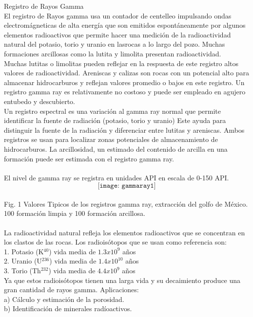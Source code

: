 \documentclass[10pt,a4paper]{report}
\begin{document}
\newpage
Registro de Rayos Gamma
\\ El registro de Rayos gamma usa un contador de centelleo impulsando ondas electromágneticas de alta energía que son emitidos espontáneamente por algunos elementos radioactivos que permite hacer una medición de la radioactividad natural del potasio, torio y uranio en lasrocas a lo largo del pozo. Muchas formaciones arcillosas como la lutita y limolita presentan radioactividad.
\\ Muchas lutitas o limolitas pueden reflejar en la respuesta de este registro altos valores de radioactividad. Areniscas y calizas son rocas con un potencial alto para almacenar hidrocarburos y reflejan valores promedio o bajos en este registro. Un registro gamma ray es relativamente no costoso y puede ser empleado en agujero entubedo y descubierto. 
\\ Un registro espectral es una variación al gamma ray normal que permite identificar la fuente de radiación (potasio, torio y uranio) Este ayuda para distinguir la fuente de la radiación y diferenciar entre lutitas y areniscas. Ambos registros se usan para localizar zonas potenciales de almacenamiento de hidrocarburos. La arcillosidad, un estimado del contenido de arcilla en una formación puede ser estimada con el registro gamma ray.
\\\\El nivel de gamma ray se registra en unidades API en escala de 0-150 API.
\\  $$\texttt{[image: gammaray1]}$$ 
\\ Fig. 1 Valores Tipicos de los registros gamma ray, extracción del golfo de México. 100 formación limpia y 100 formación arcillosa. 
\\\\ La radioactividad natural refleja los elementos radioactivos que se concentran en los clastos de las rocas. Los radioisótopos que se usan como referencia son:
\\ 1. Potasio (K$^40$) vida media de $1.3x10^9$ años
\\ 2. Uranio (U$^236$) vida media de $1.4x10^10$ años
\\ 3. Torio (Th$^232$) vida media de $4.4x10^9$ años
\\ Ya que estos radioisótopos tienen una larga vida y su decaimiento produce una gran cantidad de rayos gamma.
\newpage
Aplicaciones: 
\\ a) Cálculo y estimación de la porosidad.
\\ b) Identificación de minerales radíoactivos.
\end{document}
